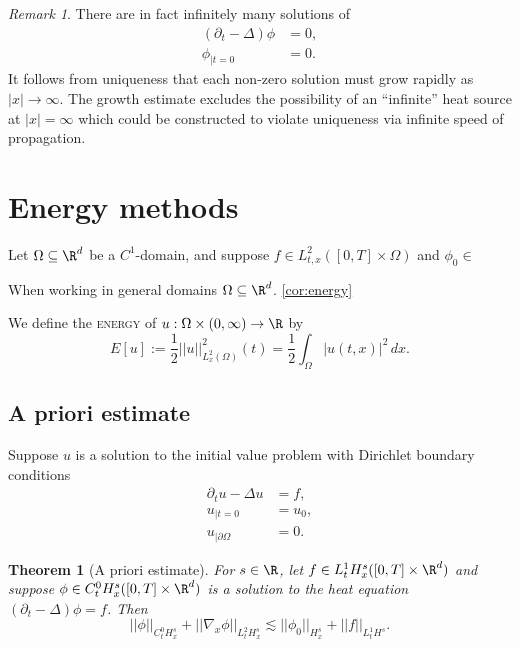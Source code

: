 \documentclass[reqno]{amsart}
\newtheorem{theorem}{Theorem}
\theoremstyle{definition}
\theoremstyle{remark}
\newtheorem*{remark}{Remark}
\newcounter{problem}[section]	\declaretheorem[style=thmrecbox,name=Problem, numberlike=problem]{statement}
\renewcommand{\emph}{\textsc}
\begin{document}
\begin{remark}
	There are in fact infinitely many solutions of 
		\begin{align*}
			(\partial_t - \Delta) \phi
				&= 0, \\
			\phi_{|t =0}
				&= 0.	
		\end{align*}
	It follows from uniqueness that each non-zero solution must grow rapidly as $|x| \to \infty$. The growth estimate excludes the possibility of an ``infinite'' heat source at $|x| = \infty$ which could be constructed to violate uniqueness via infinite speed of propagation. 
\end{remark}


\section{Energy methods}



Let $\Omega \subseteq \R^d$ be a $C^1$-domain, and suppose $f \in L^2_{t, x} ([0, T] \times \Omega)$ and $\phi_0 \in $

When working in general domains $\Omega \subseteq \R^d$. \ref{cor:energy}

We define the \emph{energy} of $u : \Omega \times (0, \infty) \to \R$ by 
	\[ E[u] := \frac12 || u||_{L^2_x (\Omega)}^2 (t) = \frac12 \int_\Omega |u(t, x)|^2 \, dx.  \]

\subsection{A priori estimate}

Suppose $u$ is a solution to the initial value problem with Dirichlet boundary conditions
	\begin{align*}
		\partial_t u - \Delta u
			&= f,\\
		u_{|t = 0}
			&= u_0, \\
		u_{|\partial \Omega}
			&= 0.	
	\end{align*}

\begin{theorem}[A priori estimate]
	For $s \in \R$, let $f \in L^1_t H^s_x ([0, T] \times \R^d)$ and suppose $\phi \in C^0_t H^s_x ([0, T] \times \R^d)$ is a solution to the heat equation $(\partial_t - \Delta) \phi = f$. Then
		\[ || \phi||_{C^0_t H^s_x} + ||\nabla_x \phi||_{L^2_t H^s_x} \lesssim ||\phi_0||_{H^s_x} + ||f||_{L^1_{t} H^s}. \]
\end{theorem}	
	
\end{document}

